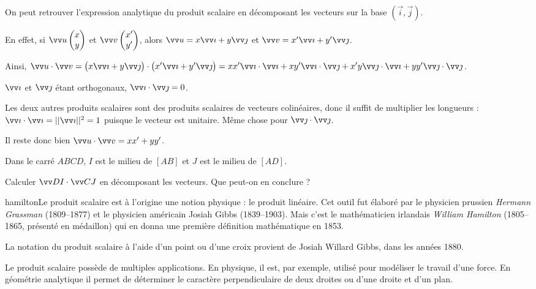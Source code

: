 \documentclass[a4paper,11pt]{article}
\begin{document}
\begin{cexemple}
On peut retrouver l'expression analytique du produit scalaire en décomposant les vecteurs sur la base $(\vec{i},\vec{j})$.

En effet, si $\coord{u}{x}{y}$ et $\coord{v}{x'}{y'}$, alors $\vect{u}=x\vect{\imath}+y\vect{\jmath}$ et $\vect{v}=x'\vect{\imath}+y'\vect{\jmath}$.

Ainsi, $\vect{u}\cdot\vect{v}=\big(x\vect{\imath}+y\vect{\jmath}\big)\cdot\big(x'\vect{\imath}+y'\vect{\jmath}\big)=xx'\vect{\imath}\cdot\vect{\imath}+xy'\vect{\imath}\cdot\vect{\jmath}+x'y\vect{\jmath}\cdot\vect{\imath}+yy'\vect{\jmath}\cdot\vect{\jmath}$.

$\vect{\imath}$ et $\vect{\jmath}$ étant orthogonaux, $\vect{\imath}\cdot\vect{\jmath}=0$.

Les deux autres produits scalaires sont des produits scalaires de vecteurs colinéaires, donc il suffit de multiplier les longueurs : $\vect{\imath}\cdot\vect{\imath}=||\vect{\imath}||^2=1$ puisque le vecteur est unitaire. Même chose pour $\vect{\jmath}\cdot\vect{\jmath}$.

Il reste donc bien $\vect{u}\cdot\vect{v}=xx'+yy'$.
\end{cexemple}

\begin{cexercice}
Dans le carré $ABCD$, $I$ est le milieu de $[AB]$ et $J$ est le milieu de $[AD]$.

Calculer $\vect{DI}\cdot\vect{CJ}$ en décomposant les vecteurs. Que peut-on en conclure ?
\end{cexercice}

\vfill

\begin{chistoire}
\vspace{-0.22cm}
\lettrine[findent=.5em,nindent=0pt,lines=4,image,novskip=0pt]{hamilton}{}Le produit scalaire est à l'origine une notion physique : le produit linéaire. Cet outil fut élaboré par le physicien prussien \textit{Hermann Grassman} (1809--1877) et le physicien américain Josiah Gibbs (1839--1903). Mais c'est le mathématicien irlandais \textit{William Hamilton} (1805--1865, présenté en médaillon) qui en donna une première définition mathématique en 1853.

\smallskip

La notation du produit scalaire à l'aide d'un point ou d'une croix provient de Josiah Willard Gibbs, dans les années 1880.

\smallskip

Le produit scalaire possède de multiples applications. En physique, il est, par exemple, utilisé pour modéliser le travail d'une force. En géométrie analytique il permet de déterminer le caractère perpendiculaire de deux droites ou d'une droite et d'un plan.
\end{chistoire}
\end{document}
